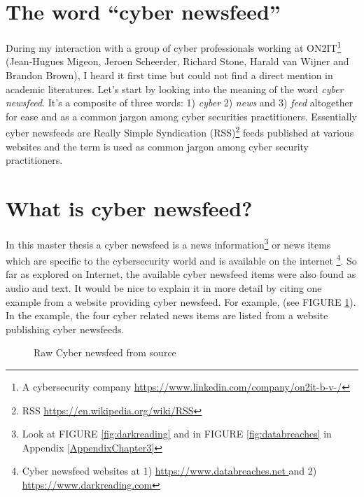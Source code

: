\section{The word \enquote{cyber newsfeed}}
During my interaction with a group of cyber professionals working at 
ON2IT\footnote{A cybersecurity company \url{https://www.linkedin.com/company/on2it-b-v-/}} (Jean-Hugues Migeon, Jeroen Scheerder, Richard Stone, Harald van Wijner and Brandon Brown), I heard it first time but could not find a direct mention  in academic literatures. 
Let’s start by looking into the meaning of the word  \textit{cyber newsfeed}. 
It's a composite of three words: 
1) \textit{cyber}
2) \textit{news} and 
3) \textit{feed} altogether for ease and as a common jargon among cyber securities practitioners. Essentially cyber newsfeeds are Really Simple Syndication (RSS)\footnote{RSS \url{https://en.wikipedia.org/wiki/RSS}} feeds published at various websites and the term is used as common jargon among cyber security practitioners. 


\section{What is cyber newsfeed?}

In this master thesis a cyber newsfeed is a news information\footnote{Look at FIGURE \ref{fig:darkreading} and in FIGURE \ref{fig:databreaches} in Appendix \ref{AppendixChapter3}}  
or news items which are specific to the cybersecurity world 
and is available on the internet \footnote{Cyber newsfeed websites at 1) \url{https://www.databreaches.net } and 2) \url{ https://www.darkreading.com}}. 
So far as explored on Internet, the available cyber newsfeed items were also found as audio and text. 
It would be nice to explain it in more detail by citing one example from a website providing cyber newsfeed. 
For example, (see FIGURE \ref{fig:cyber-feed}). In the example, the four cyber related news items are listed from a website publishing cyber newsfeeds. 

\begin{figure}[htbp!]
\centering
    \caption{Raw Cyber newsfeed from source \citep{news-feed}}
    \label{fig:cyber-feed}
\end{figure}
\FloatBarrier

